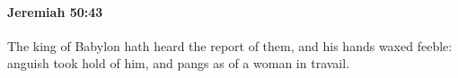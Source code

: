 
		\paragraph{Jeremiah 50:43} %
			\label{JEREMIAH-50-43}

			The king of Babylon hath heard the report of them, and his hands waxed feeble: anguish took hold of him, and pangs as of a woman in travail.


